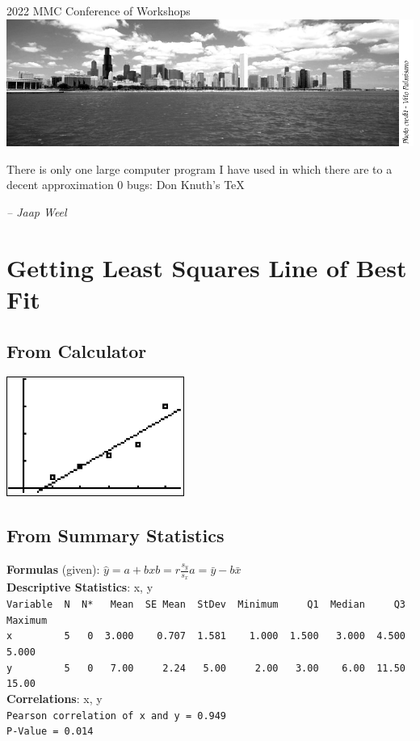 \documentclass[9pt, oneside]{extarticle}   	%
\begin{document}
\begin{titlepage}
	\vfill %
	\vspace{0.3\baselineskip} %
	2022 %
	{\large MMC Conference of Workshops}\\[.1in] %
	\includegraphics[width=\textwidth]{img/mmc_logo.png}
\end{titlepage}

\tableofcontents
\begin{centering}
	\date{\today}
\end{centering}
\newpage
\epigraph{There is only one large computer program I have used in which there are to a decent approximation 0 bugs: Don Knuth's TeX}{\textit{ -- Jaap Weel}}

\section{Getting Least Squares Line of Best Fit} %
\label{}
\subsection{From Calculator}
	\includegraphics[width=.15\textwidth]{img/5_scat}

\subsection{From Summary Statistics} %
\label{sub:from_summary_statistics}
{\bf Formulas} (given): $\hat{y} = a + bx$\quad\quad$b = r\frac{s_y}{s_x}$\quad\quad$a=\bar{y}-b\bar{x}$\\[.2in]
{\bf Descriptive Statistics}: x, y\\
\verb|Variable  N  N*   Mean  SE Mean  StDev  Minimum     Q1  Median     Q3  Maximum|\\
\verb|x         5   0  3.000    0.707  1.581    1.000  1.500   3.000  4.500    5.000|\\
\verb|y         5   0   7.00     2.24   5.00     2.00   3.00    6.00  11.50    15.00|\\[.1in]
{\bf Correlations}: x, y \\
\verb|Pearson correlation of x and y = 0.949|\\
\verb|P-Value = 0.014|\\[.5in]
\end{document}
